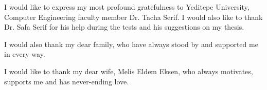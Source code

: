 \begin{acknowledgements}

I would like to express my most profound gratefulness to Yeditepe University, Computer Engineering faculty member Dr. Tacha Serif. I would also like to thank Dr. Safa Serif for his help during the tests and his suggestions on my thesis.

I would also thank my dear family, who have always stood by and supported me in every way.

I would like to thank my dear wife, Melis Eldem Eksen, who always motivates, supports me and has never-ending love.

\end{acknowledgements}